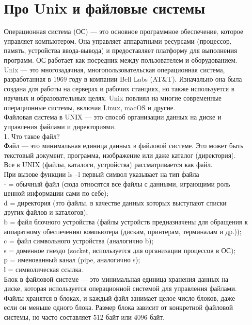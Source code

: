 


\section{Про Unix и файловые системы}
Операционная система (ОС) — это основное программное обеспечение, которое управляет компьютером. Она управляет аппаратными ресурсами (процессор, память, устройства ввода-вывода) и предоставляет платформу для выполнения программ. ОС работает как посредник между пользователем и оборудованием. Unix — это многозадачная, многопользовательская операционная система, разработанная в 1969 году в компании Bell Labs (AT\&T). Изначально она была создана для работы на серверах и рабочих станциях, но также используется в научных и образовательных целях. Unix повлиял на многие современные операционные системы, включая Linux, macOS и другие. \\
Файловая система в UNIX — это способ организации данных на диске и управления файлами и директориями. \\
1. Что такое файл? \\
Файл — это минимальная единица данных в файловой системе. Это может быть текстовый документ, программа, изображение или даже каталог (директория). Все в UNIX (файлы, каталоги, устройства) рассматривается как файл. \\
При вызове функции ls –l первый символ указывает на тип файла \\
- = обычный файл (сюда относятся все файлы с данными, играющими роль ценной информации сами по себе); \\
d = директория (это файлы, в качестве данных которых выступают списки других файлов и каталогов); \\
b = файл блочного устройства (файлы устройств предназначены для обращения к аппаратному обеспечению компьютера (дискам, принтерам, терминалам и др.)); \\
c = файл символьного устройства (аналогично b); \\
s = доменное гнездо (socket, используется для организации процессов в ОС); \\
p = именованный канал (pipe, аналогично s); \\
l = символическая ссылка. \\
Блок в файловой системе — это минимальная единица хранения данных на диске, которая используется операционной системой для управления файлами. Файлы хранятся в блоках, и каждый файл занимает целое число блоков, даже если он меньше одного блока. Размер блока зависит от конкретной файловой системы, но часто составляет 512 байт или 4096 байт. \\
